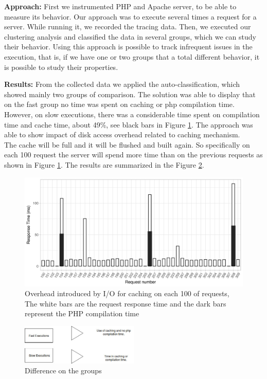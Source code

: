 \textbf{Approach:}
    First we instrumented PHP and Apache server, to be able to measure its behavior. Our approach was to execute several times a request for a server. While running it, we recorded the tracing data. Then, we executed our clustering analysis and classified the data in several groups, which we can study their behavior. Using this approach is possible to track infrequent issues in the execution, that is, if we have one or two groups that a total different behavior, it is possible to study their properties.
    
\textbf{Results:}
    From the collected data we applied the auto-classification, which showed mainly two groups of comparison. The solution was able to display that on the fast group no time was spent on caching or php compilation time. However, on slow executions, there was a considerable time spent on compilation time and cache time, about 49\%, see black bars in Figure \ref{fig:server-time-series}. The approach was able to show impact of disk access overhead related to caching mechanism.\\
    The cache will be full and it will be flushed and built again. So specifically on each 100 request the server will spend more time than on the previous requests as shown in Figure \ref{fig:server-time-series}. The results are summarized in the Figure \ref{fig:groups_php}.
    
        
    \begin{figure}[h]
      \centering
        \includegraphics[width=1.0\textwidth]{figures/server-time-series-bar.png}
        \caption{Overhead introduced by I/O for caching on each 100 of requests, The white bars are the request response time and the dark bars represent the PHP compilation time}
        \label{fig:server-time-series}
    \end{figure}
    
    
    \begin{figure}[h]
    \centering
        \includegraphics[width=0.50\textwidth]{figures/groups_results.jpg}
         \caption{Difference on the groups}
         \label{fig:groups_php}
     \end{figure}
    
